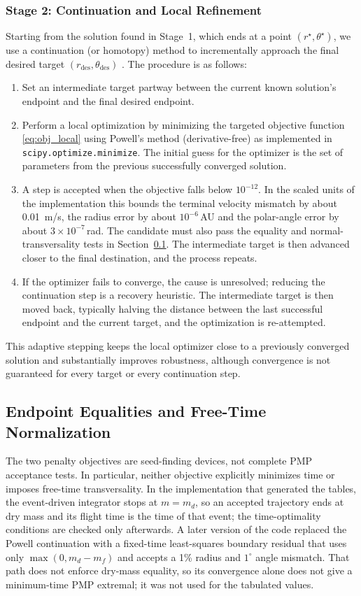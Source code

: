 \documentclass[journal,a4paper]{IEEEtran}
\begin{document}
\subsubsection{Stage 2: Continuation and Local Refinement}
Starting from the solution found in Stage~1, which ends at a point $(r^\star, \theta^\star)$, we use a continuation (or homotopy) method to incrementally approach the final desired target $(r_\text{des}, \theta_\text{des})$ \cite{Allgower1990}. The procedure is as follows:
\begin{enumerate}
    \item Set an intermediate target partway between the current known solution's endpoint and the final desired endpoint.
    \item Perform a local optimization by minimizing the targeted objective function \eqref{eq:obj_local} using Powell's method \cite{Powell1964} (derivative-free) as implemented in \texttt{scipy.optimize.minimize}. The initial guess for the optimizer is the set of parameters from the previous successfully converged solution.
    \item A step is accepted when the objective falls below $10^{-12}$. In the scaled units of the implementation this bounds the terminal velocity mismatch by about \SI{0.01}{m/s}, the radius error by about $10^{-6}$\,AU and the polar-angle error by about $3\times10^{-7}$\,rad. The candidate must also pass the equality and normal-transversality tests in Section~\ref{sec:acceptance}. The intermediate target is then advanced closer to the final destination, and the process repeats.
    \item If the optimizer fails to converge, the cause is unresolved; reducing the continuation step is a recovery heuristic. The intermediate target is then moved back, typically halving the distance between the last successful endpoint and the current target, and the optimization is re-attempted.
\end{enumerate}
This adaptive stepping keeps the local optimizer close to a previously converged solution and substantially improves robustness, although convergence is not guaranteed for every target or every continuation step.

\subsection{Endpoint Equalities and Free-Time Normalization}
\label{sec:acceptance}
The two penalty objectives are seed-finding devices, not complete PMP
acceptance tests. In particular, neither objective explicitly minimizes
time or imposes free-time transversality. In the implementation that
generated the tables, the event-driven integrator stops at $m=m_d$, so an
accepted trajectory ends at dry mass and its flight time is the time of
that event; the time-optimality conditions are checked only afterwards.
A later version of the code replaced the Powell continuation with a
fixed-time least-squares boundary residual that uses only
$\max(0,m_d-m_f)$ and accepts a 1\% radius and $1^\circ$ angle mismatch.
That path does not enforce dry-mass equality, so its convergence alone
does not give a minimum-time PMP extremal; it was not used for the
tabulated values.
\end{document}
